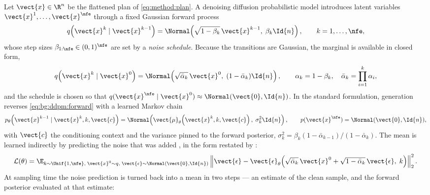 Let $\vect{x} \in \R^{n}$ be the flattened plan of \eqref{eq:method:plan}. A denoising diffusion probabilistic model
\parencite{sohl2015deep,ho2020denoising} introduces latent variables
$\vect{x}^{1},\dots,\vect{x}^{\nfe}$ through a fixed Gaussian forward process
\begin{equation}\label{eq:bg:ddpm:forward}
  q\!\left(\vect{x}^{k} \mid \vect{x}^{k-1}\right)
  = \Normal\!\left(\sqrt{1-\beta_{k}}\,\vect{x}^{k-1},\; \beta_{k}\Id{n}\right),
  \qquad k = 1,\dots,\nfe ,
\end{equation}
whose step sizes $\beta_{1:\nfe} \in (0,1)^{\nfe}$ are set by a \emph{noise schedule}. Because
the transitions are Gaussian, the marginal is available in closed form,
\begin{equation}\label{eq:bg:ddpm:marginal}
  q\!\left(\vect{x}^{k} \mid \vect{x}^{0}\right)
  = \Normal\!\left(\sqrt{\bar{\alpha}_{k}}\,\vect{x}^{0},\;(1-\bar{\alpha}_{k})\Id{n}\right),
  \qquad
  \alpha_{k} = 1-\beta_{k}, \quad \bar{\alpha}_{k} = \prod_{i=1}^{k}\alpha_{i},
\end{equation}
and the schedule is chosen so that $q(\vect{x}^{\nfe}\mid\vect{x}^{0}) \approx \Normal(\vect{0},\Id{n})$.
In the standard formulation, generation reverses \eqref{eq:bg:ddpm:forward} with a learned Markov chain
\begin{equation}\label{eq:bg:ddpm:reverse}
  p_{\theta}\!\left(\vect{x}^{k-1}\mid\vect{x}^{k},k,\vect{c}\right)
  = \Normal\!\left(\vect{\mu}_{\theta}\!\left(\vect{x}^{k},k,\vect{c}\right),\;\sigma_{k}^{2}\Id{n}\right),
  \qquad p(\vect{x}^{\nfe}) = \Normal(\vect{0},\Id{n}),
\end{equation}
with $\vect{c}$ the conditioning context and the variance pinned to the forward posterior,
$\sigma_{k}^{2} = \beta_{k}(1-\bar{\alpha}_{k-1})/(1-\bar{\alpha}_{k})$. The mean is learned
indirectly by predicting the noise that was added \parencite{ho2020denoising}, in the form
restated by \parencite[Sec.~4]{romer2025diffusion}:
\begin{equation}\label{eq:bg:ddpm:loss}
  \mathcal{L}(\theta)
  = \E_{k \sim \Unif\{1,\nfe\},\; \vect{x}^{0}\sim q,\; \vect{\epsilon}\sim\Normal(\vect{0},\Id{n})}
    \left\|\vect{\epsilon} - \vect{\epsilon}_{\theta}\!\left(
      \sqrt{\bar{\alpha}_{k}}\,\vect{x}^{0} + \sqrt{1-\bar{\alpha}_{k}}\,\vect{\epsilon},\;k\right)\right\|_{2}^{2}.
\end{equation}
At sampling time the noise prediction is turned back into a mean in two steps --- an estimate of
the clean sample, and the forward posterior evaluated at that estimate:
